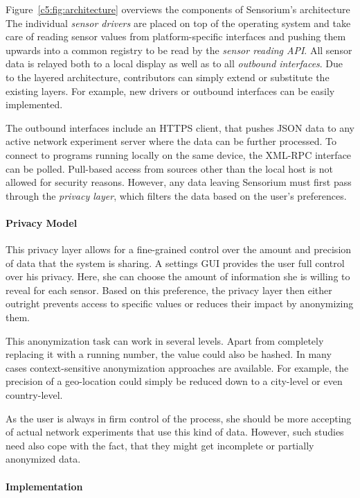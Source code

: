 Figure~\ref{c5:fig:architecture} overviews the components of Sensorium's architecture The individual \textit{sensor drivers} are placed on top of the operating system and take care of reading sensor values from platform-specific interfaces and pushing them upwards into a common registry to be read by the \textit{sensor reading \gls{API}}. All sensor data is relayed both to a local display as well as to all \textit{outbound interfaces}. Due to the layered architecture, contributors can simply extend or substitute the existing layers. For example, new drivers or outbound interfaces can be easily implemented. 

The outbound interfaces include an \gls{HTTPS} client, that pushes \acrshort{JSON} data to any active network experiment server where the data can be further processed. To connect to programs running locally on the same device, the \acrshort{XML}-\acrshort{RPC} interface can be polled. Pull-based access from sources other than the local host is not allowed for security reasons. However, any data leaving Sensorium must first pass through the \textit{privacy layer}, which filters the data based on the user's preferences.

\paragraph{Privacy Model}

This privacy layer allows for a fine-grained control over the amount and precision of data that the system is sharing. A settings \gls{GUI} provides the user full control over his privacy. Here, she can choose the amount of information she is willing to reveal for each sensor. Based on this preference, the privacy layer then either outright prevents access to specific values or reduces their impact by anonymizing them.

This anonymization task can work in several levels. Apart from completely replacing it with a running number, the value could also be hashed. In many cases context-sensitive anonymization approaches are available. For example, the precision of a geo-location could simply be reduced down to a city-level or even country-level.

As the user is always in firm control of the process, she should be more accepting of actual network experiments that use this kind of data. However, such studies need also cope with the fact, that they might get incomplete or partially anonymized data.

\paragraph{Implementation}

